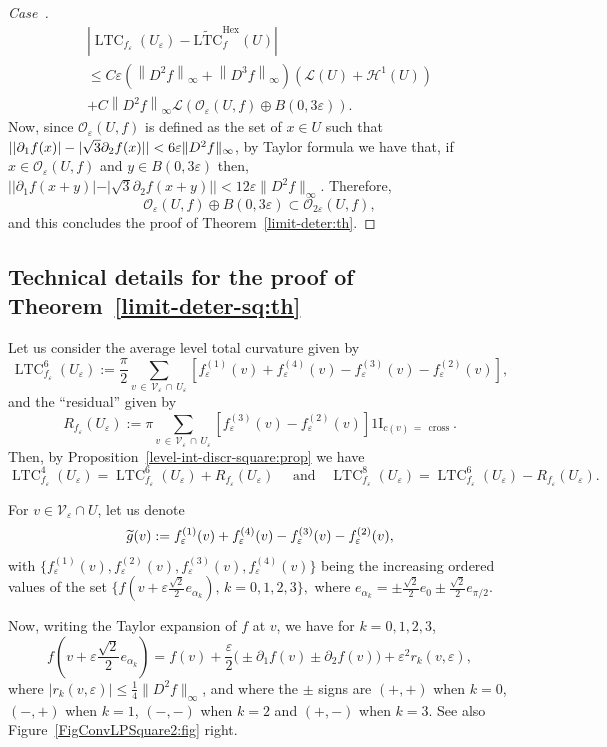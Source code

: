 \documentclass[10pt]{amsart}
\theoremstyle{definition}\newtheorem{defi}[theo]{Definition}\newtheorem{rema}[theo]{Remark}\newtheorem{exam}[theo]{Example}\newtheorem{exem}[theo]{Example}\newtheorem{nota}[theo]{Notation}
\newcommand{\ind}{{1\!\!\mathrm{I}}}
\newcommand{\eps}{\varepsilon}
\DeclareMathOperator{\LTC}{LTC}
\DeclareMathOperator{\Hex}{Hex}
\DeclareMathOperator{\cross}{cross}
\newcommand{\tLTC}{\widetilde{\mathrm{LTC}}}
\newcommand{\calH}{\mathcal{H}}
\newcommand{\calL}{\mathcal{L}}
\newcommand{\calV}{\mathcal{V}}
\newcommand{\calO}{\mathcal{O}}
\newcounter{casecount}
\newenvironment{lastcase}{\refstepcounter{casecount}\begin{proof}[Case~\thecasecount]}{\end{proof}}
\let\oldtilde\tilde
\renewcommand*{\tilde}[1]{\mathchoice{\widetilde{#1}}{\widetilde{#1}}{\oldtilde{#1}}{\oldtilde{#1}}}
\begin{document}
\begin{lastcase}
\begin{multline*}
\left|\LTC_{f_\eps}(U_\eps)-\tLTC_{f}^{\Hex}(U)\right|
\\
\le C\eps
\left(\left\|D^2f\right\|_\infty+\left\|D^3f\right\|_\infty\right)\left(\calL(U)+\calH^1(U)\right)\\+ C \left\|D^2f\right\|_\infty \calL\left(\calO_{\eps} (U,f)\oplus B(0,3\eps)\right).
\end{multline*}
Now, since ${\calO}_{\eps} (U,f)$ is defined as the set of $x\in U$ such that $| |\partial_1f(x)|-|\sqrt{3}\partial_2f(x)| | \linebreak <6\eps\|D^2 f\|_\infty$, by Taylor formula we have that, if $x\in {\calO}_{\eps} (U,f)$ and $y\in B(0,3\eps)$ then, $| |\partial_1f(x+y)|-|\sqrt{3}\partial_2f(x+y)| | <12\eps\|D^2 f\|_\infty$. Therefore,
\[
{\calO}_{\eps} (U,f) \oplus B(0,3\eps) \subset {\calO}_{2\eps} (U,f),
\]
and this concludes the proof of Theorem~\ref{limit-deter:th}.
\end{lastcase}

\subsection{Technical details for the proof of Theorem~\ref{limit-deter-sq:th}}\label{app:limit-deter-sq:th}

Let us consider the average level total curvature given by
\[
\LTC_{f_\eps}^6(U_\eps) := \frac{\pi}{2} \sum_{v\,\in\,\calV_\varepsilon\,\cap\,U_\eps} \left[f_\eps^{(1)}(v) + f_\eps^{(4)}(v) - f_\eps^{(3)}(v)
-f_\eps^{(2)}(v)\right],
\]
and the ``residual'' given by
\[
R_{f_\eps}(U_\eps) := \pi
\sum_{v\,\in\,\calV_\eps\,\cap\,U_\eps} \left[f_\eps^{(3)}(v) - f_\eps^{(2)}(v)\right]
\ind_{c(v)\,=\,\cross}.
\]
Then, by Proposition~\ref{level-int-discr-square:prop} we have
\[
\LTC^4_{f_\eps}(U_\eps) =\LTC^6_{f_\eps}(U_\eps)+ R_{f_\eps}(U_\eps)
\quad \text{ and
} \quad \LTC^8_{f_\eps}(U_\eps) =\LTC^6_{f_\eps}(U_\eps) - R_{f_\eps}(U_\eps).
\]


For $v\in\calV_\eps\cap U$, let us denote
\[
\tilde{g}(v) := f_\eps^{(1)}(v) + f_\eps^{(4)}(v) - f_\eps^{(3)}(v)
-f_\eps^{(2)}(v),
\]
with $\{ f_\eps^{(1)}(v), f_\eps^{(2)}(v), f_\eps^{(3)}(v), f_\eps^{(4)}(v) \}$ being the increasing ordered values of the set $\{ f(v +\eps\tfrac{\sqrt{2}}{2} e_{\alpha_k}), \, k=0,1,2,3 \},$ where $e_{\alpha_k}= \pm \tfrac{\sqrt{2}}{2} e_0 \pm \tfrac{\sqrt{2}}{2} e_{\pi/2}$.

Now, writing the Taylor expansion of $f$ at $v$, we have for $k=0,1,2,3$,
\begin{equation}\label{TaylorSq:eq}
f\left(v + \eps\frac{\sqrt{2}}{2} e_{\alpha_k}\right) = f(v) +
\frac{\eps}{2}\big(\pm\partial_1f(v) \pm\partial_2f(v)\big) + \eps^2 r_k(v,\eps),
\end{equation}
where $|r_k(v,\eps)|\leq \frac{1}{4} \|D^2 f\|_\infty$, and where the $\pm$ signs are $(+,+)$ when $k=0$,\linebreak$(-,+)$ when $k=1$, $(-,-)$ when $k=2$ and $(+,-)$ when $k=3$. See also Figure~\ref{FigConvLPSquare2:fig} right.
\end{document}
